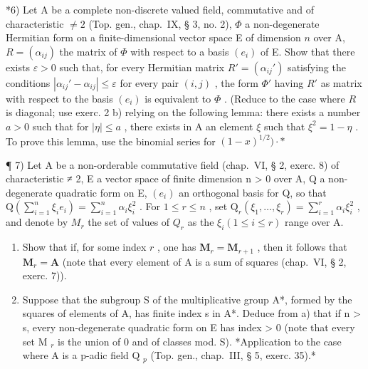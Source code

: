 *6) Let A be a complete non-discrete valued field, commutative and of characteristic \(\neq 2\) (Top. gen., chap.~IX, § 3, no. 2), \(\Phi\) a non-degenerate Hermitian form on a finite-dimensional vector space E of dimension \(n\) over A, \(R = (\alpha_{ij})\) the matrix of \(\Phi\) with respect to a basis \((e_i)\) of E. Show that there exists \(\varepsilon > 0\) such that, for every Hermitian matrix \(R' = (\alpha_{ij}')\) satisfying the conditions \(|\alpha_{ij}' - \alpha_{ij}| \leqslant \varepsilon\) for every pair \((i, j)\) , the form \(\Phi'\) having \(R'\) as matrix with respect to the basis \((e_i)\) is equivalent to \(\Phi\) . (Reduce to the case where \(R\) is diagonal; use exerc. 2 b) relying on the following lemma: there exists a number \(a > 0\) such that for \(|\eta| \leqslant a\) , there exists in A an element \(\xi\) such that \(\xi^2 = 1 - \eta\) . To prove this lemma, use the binomial series for \((1 - x)^{1/2})\cdot *\)

¶ 7) Let A be a non-orderable commutative field (chap.~VI, § 2, exerc. 8) of characteristic ≠ 2, E a vector space of finite dimension n \textgreater{} 0 over A, Q a non-degenerate quadratic form on E, \((e_i)\) an orthogonal basis for Q, so that \(\mathrm{Q}\left(\sum_{i=1}^{n}\xi_{i}e_{i}\right)=\sum_{i=1}^{n}\alpha_{i}\xi_{i}^{2}\) . For \(1\leqslant r\leqslant n\) , set \(\mathrm{Q}_{r}(\xi_{1},\ldots,\xi_{r})=\sum_{i=1}^{r}\alpha_{i}\xi_{i}^{2}\) , and denote by \(M_{r}\) the set of values of \(Q_{r}\) as the \(\xi_{i}\left(1\leqslant i\leqslant r\right)\) range over A.

\begin{enumerate}
\def\labelenumi{\alph{enumi})}
\item
  Show that if, for some index \(r\) , one has \(\mathbf{M}_r = \mathbf{M}_{r+1}\) , then it follows that \(\mathbf{M}_r = \mathbf{A}\) (note that every element of A is a sum of squares (chap.~VI, § 2, exerc. 7)).
\item
  Suppose that the subgroup S of the multiplicative group A*, formed by the squares of elements of A, has finite index s in A*. Deduce from a) that if n \textgreater{} s, every non-degenerate quadratic form on E has index \textgreater{} 0 (note that every set M \(_{r}\) is the union of 0 and of classes mod. S). *Application to the case where A is a p-adic field Q \(_{p}\) (Top. gen., chap.~III, § 5, exerc. 35).*
\end{enumerate}

